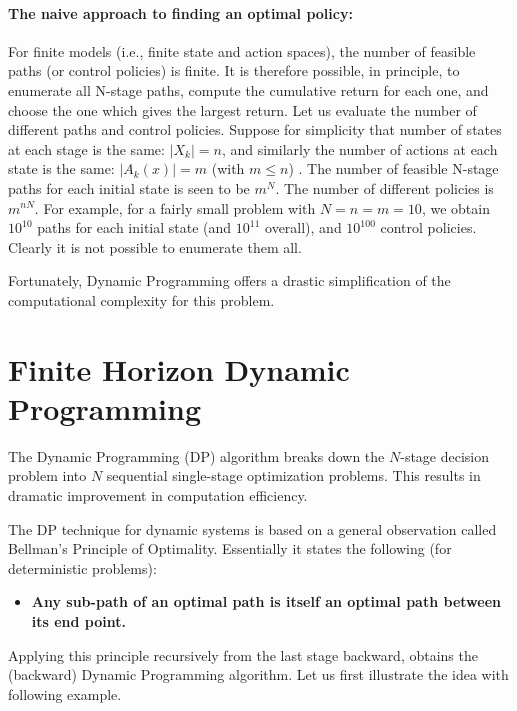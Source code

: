 \paragraph{The naive approach to finding an optimal policy:}  For finite models (i.e., finite state and action spaces), the number of feasible paths (or control policies) is finite.  It is therefore possible, in principle, to enumerate all N-stage paths, compute the cumulative return for each one, and choose the one which gives the largest return.
Let us evaluate the number of different paths and control policies.
Suppose for simplicity that number of states at each stage is the same: $|{X_k}| = n$, and similarly the number of actions at each state is the same: $|{A_k}(x)| = m$ (with $m \le n$) . The number of feasible N-stage paths for each initial state is seen to be ${m^N}$. The number of different policies is ${m^{nN}}$.
For example, for a fairly small problem with $N = n = m = 10$, we obtain ${10^{10}}$ paths for each initial state (and ${10^{11}}$ overall), and ${10^{100}}$ control policies. Clearly it is not possible to enumerate them all.

Fortunately, Dynamic Programming offers a drastic simplification of the computational complexity for this problem.

\section{Finite Horizon Dynamic Programming}

The Dynamic Programming (DP) algorithm breaks down the $N$-stage decision problem into $N$ sequential single-stage optimization problems. This results in dramatic improvement in computation efficiency.

The DP technique for dynamic systems is based on a general observation called Bellman's Principle of Optimality. Essentially it states the following (for deterministic problems):
\begin{itemize}
  \item \textbf{Any sub-path of an optimal path is itself an optimal path between its end point.}
\end{itemize}

Applying this principle recursively from the last stage backward, obtains the (backward) Dynamic Programming algorithm. Let us first illustrate the idea with following example.

